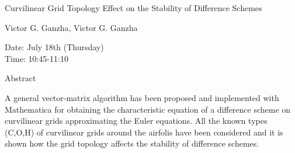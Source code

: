 \begin{center}
\LARGE
Curvilinear Grid Topology Effect on the Stability of
                      Difference Schemes
\end{center}

\begin{center}
\Large
Victor G. Ganzha, Victor G. Ganzha

\end{center}

\noindent
Date:  July 18th (Thursday)\\
Time:  10:45-11:10\\

\begin{center}
\large
Abstract
\end{center}

A general vector-matrix algorithm has been proposed and implemented with Mathematica for
obtaining the characteristic equation of a difference scheme on curvilinear grids approximating the
Euler equations. All the known types (C,O,H) of curvilinear grids around the airfolis have been
considered and it is shown how the grid topology affects the stability of difference schemes. 

